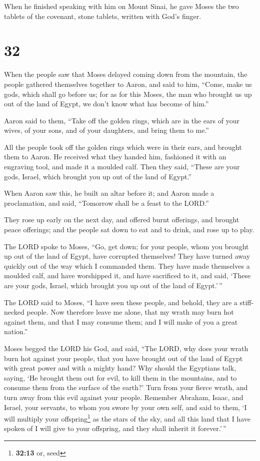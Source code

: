  When he finished speaking with him on Mount Sinai, he
gave Moses the two tablets of the covenant, stone tablets, written with
God's finger.

\hypertarget{section-31}{%
\section{32}\label{section-31}}

 When the people saw that Moses delayed coming down from
the mountain, the people gathered themselves together to Aaron, and said
to him, ``Come, make us gods, which shall go before us; for as for this
Moses, the man who brought us up out of the land of Egypt, we don't know
what has become of him.''

 Aaron said to them, ``Take off the golden rings, which
are in the ears of your wives, of your sons, and of your daughters, and
bring them to me.''

 All the people took off the golden rings which were in
their ears, and brought them to Aaron.  He received what
they handed him, fashioned it with an engraving tool, and made it a
moulded calf. Then they said, ``These are your gods, Israel, which
brought you up out of the land of Egypt.''

 When Aaron saw this, he built an altar before it; and
Aaron made a proclamation, and said, ``Tomorrow shall be a feast to the
LORD.''

 They rose up early on the next day, and offered burnt
offerings, and brought peace offerings; and the people sat down to eat
and to drink, and rose up to play.

 The LORD spoke to Moses, ``Go, get down; for your people,
whom you brought up out of the land of Egypt, have corrupted themselves!
 They have turned away quickly out of the way which I
commanded them. They have made themselves a moulded calf, and have
worshipped it, and have sacrificed to it, and said, `These are your
gods, Israel, which brought you up out of the land of Egypt.'\,''

 The LORD said to Moses, ``I have seen these people, and
behold, they are a stiff-necked people.  Now therefore
leave me alone, that my wrath may burn hot against them, and that I may
consume them; and I will make of you a great nation.''

 Moses begged the LORD his God, and said, ``The LORD, why
does your wrath burn hot against your people, that you have brought out
of the land of Egypt with great power and with a mighty hand?
 Why should the Egyptians talk, saying, `He brought them
out for evil, to kill them in the mountains, and to consume them from
the surface of the earth?' Turn from your fierce wrath, and turn away
from this evil against your people.  Remember Abraham,
Isaac, and Israel, your servants, to whom you swore by your own self,
and said to them, `I will multiply your offspring\footnote{\textbf{32:13}
  or, seed} as the stars of the sky, and all this land that I have
spoken of I will give to your offspring, and they shall inherit it
forever.'\,''

